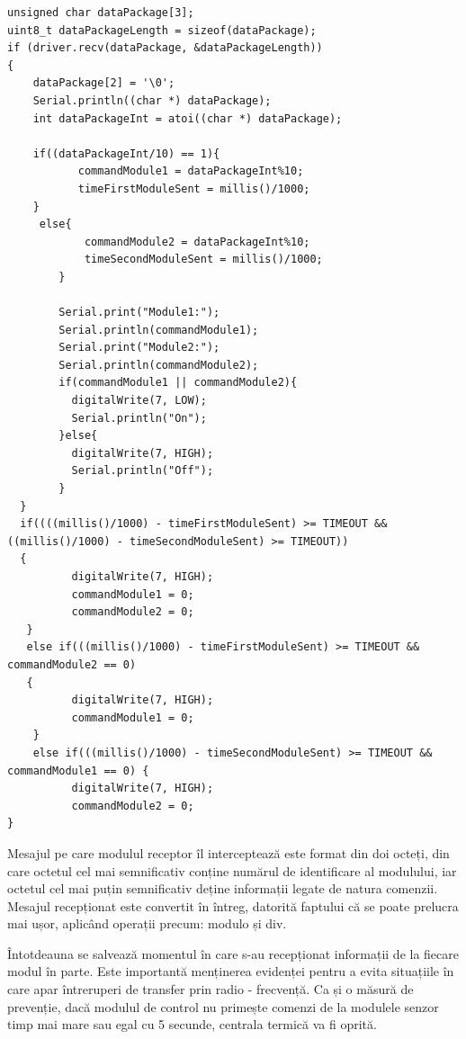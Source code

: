 \vspace{1em}
	
\begin{lstlisting}
unsigned char dataPackage[3];
uint8_t dataPackageLength = sizeof(dataPackage);
if (driver.recv(dataPackage, &dataPackageLength))
{
    dataPackage[2] = '\0';
    Serial.println((char *) dataPackage);
    int dataPackageInt = atoi((char *) dataPackage);

    if((dataPackageInt/10) == 1){
           commandModule1 = dataPackageInt%10;
           timeFirstModuleSent = millis()/1000;
    }
     else{
            commandModule2 = dataPackageInt%10;
            timeSecondModuleSent = millis()/1000;
        }
        
        Serial.print("Module1:");
        Serial.println(commandModule1);
        Serial.print("Module2:");
        Serial.println(commandModule2);
        if(commandModule1 || commandModule2){
          digitalWrite(7, LOW);
          Serial.println("On");
        }else{
          digitalWrite(7, HIGH);
          Serial.println("Off");
        }
  }
  if((((millis()/1000) - timeFirstModuleSent) >= TIMEOUT && ((millis()/1000) - timeSecondModuleSent) >= TIMEOUT))
  {
          digitalWrite(7, HIGH);
          commandModule1 = 0;
          commandModule2 = 0;
   }
   else if(((millis()/1000) - timeFirstModuleSent) >= TIMEOUT && commandModule2 == 0)
   {
          digitalWrite(7, HIGH);
          commandModule1 = 0;
    }
    else if(((millis()/1000) - timeSecondModuleSent) >= TIMEOUT && commandModule1 == 0) {
          digitalWrite(7, HIGH);
          commandModule2 = 0;
}
\end{lstlisting}
\vspace{2em} 

	Mesajul pe care modulul receptor îl interceptează este format din doi octeți, din care octetul cel mai semnificativ conține numărul de identificare al modulului, iar octetul cel mai puțin semnificativ deține informații legate de natura comenzii. Mesajul recepționat este convertit în întreg, datorită faptului că se poate prelucra mai ușor, aplicând operații precum: modulo și div.

	Întotdeauna se salvează momentul în care s-au recepționat informații de la fiecare modul în parte. Este importantă menținerea evidenței pentru a evita situațiile în care apar întreruperi de transfer prin radio - frecvență. Ca și o măsură de prevenție, dacă modulul de control nu primește comenzi de la modulele senzor timp mai mare sau egal cu 5 secunde, centrala termică va fi oprită.

